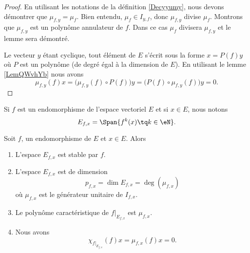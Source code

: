 \begin{proof}
    En utilisant les notations de la définition \ref{Decyyumy}, nous devons démontrer que \( \mu_{f,y}=\mu_f\). Bien entendu, \( \mu_f\in I_{y,f}\), donc \( \mu_{f,y}\) divise \( \mu_f\). Montrons que \( \mu_{f,y}\) est un polynôme annulateur de \( f\). Dans ce cas \( \mu_f\) divisera \( \mu_{f,y}\) et le lemme sera démontré.

    Le vecteur \( y\) étant cyclique, tout élément de \( E\) s'écrit sous la forme \( x=P(f)y\) où \( P\) est un polynôme (de degré égal à la dimension de \( E\)). En utilisant le lemme \ref{LemQWvhYb} nous avons
    \begin{equation}
            \mu_{f,y}(f)x=\big( \mu_{f,y}(f)\circ P(f) \big)y
            =\big( P(f)\circ \mu_{f,y}(f) \big)y
            =0.
    \end{equation}
\end{proof}

Si \( f\) est un endomorphisme de l'espace vectoriel \( E\) et si \( x\in E\), nous notons 
\begin{equation}
    E_{f,x}=\Span\{ f^k(x)\tq k\in \eN \}.
\end{equation}

\begin{proposition}\label{PropNrZGhT}
    Soit \( f\), un endomorphisme de \( E\) et \( x\in E\). Alors
    \begin{enumerate}
        \item
            L'espace \( E_{f,x}\) est stable par \( f\).
        \item\label{ItemfzKOCo}
            L'espace \( E_{f,x}\) est de dimension
            \begin{equation}
                p_{f,x}=\dim E_{f,x}=\deg(\mu_{f,x})
            \end{equation}
            où \( \mu_{f,x}\) est le générateur unitaire de \( I_{f,x}\).
        \item   \label{ItemKHNExH}
            Le polynôme caractéristique de \( f|_{E_{f,x}}\) est \( \mu_{f,x}\).
        \item   \label{ItemHMviZw}
            Nous avons
            \begin{equation}
                \chi_{f|_{E_{f,x}}}(f)x=\mu_{f,x}(f)x=0.
            \end{equation}
    \end{enumerate}
\end{proposition}


